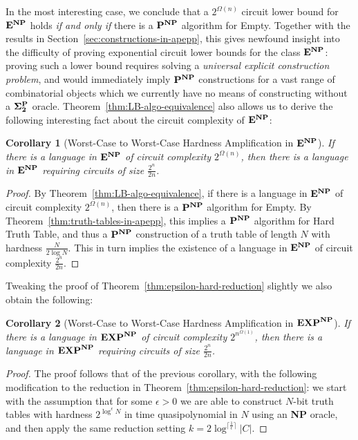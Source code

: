 \documentclass[11pt]{article}
\newtheorem{corollary}{Corollary}
\newcommand{\varbound}{\frac{2^n}{2n}}
\newcommand{\ttbound}{\frac{N}{2\log N}}
\def\cl{\bf}
\begin{document}
In the most interesting case, we conclude that a $2^{\Omega(n)}$ circuit lower bound for ${\cl E}^{\cl NP}$ holds \emph{if and only if} there is a ${\cl P}^{\cl NP}$ algorithm for {\sc Empty}. Together with the results in Section~\ref{sec:constructions-in-apepp}, this gives newfound insight into the difficulty of proving exponential circuit lower bounds for the class ${\cl E}^{\cl NP}$: proving such a lower bound requires solving a \emph{universal explicit construction problem}, and would immediately imply ${\cl P}^{\cl NP}$ constructions for a vast range of combinatorial objects which we currently have no means of constructing without a ${\cl \Sigma_2^P}$ oracle. Theorem~\ref{thm:LB-algo-equivalence} also allows us to derive the following interesting fact about the circuit complexity of ${\cl E}^{\cl NP}$:
\begin{corollary}[Worst-Case to Worst-Case Hardness Amplification in ${\cl E}^{\cl NP}$]\label{cor:e-hard}
If there is a language in ${\cl E}^{\cl NP}$ of circuit complexity $2^{\Omega(n)}$, then there is a language in ${\cl E}^{\cl NP}$ requiring circuits of size $\varbound$.
\end{corollary}
\begin{proof}
By Theorem~\ref{thm:LB-algo-equivalence}, if  there is a language in ${\cl E}^{\cl NP}$ of circuit complexity $2^{\Omega(n)}$, then there is a ${\cl P}^{\cl NP}$ algorithm for {\sc Empty}. By Theorem~\ref{thm:truth-tables-in-apepp}, this implies a ${\cl P}^{\cl NP}$ algorithm for {\sc Hard Truth Table}, and thus a ${\cl P}^{\cl NP}$ construction of a truth table of length $N$ with hardness $\ttbound$. This in turn implies the existence of a language in ${\cl E}^{\cl NP}$ of circuit complexity $\varbound$. 
\end{proof}

Tweaking the proof of Theorem~\ref{thm:epsilon-hard-reduction} slightly we also obtain the following:
\begin{corollary}[Worst-Case to Worst-Case Hardness Amplification in ${\cl EXP}^{\cl NP}$]\label{cor:exp-hard}
If there is a language in ${\cl EXP}^{\cl NP}$ of circuit complexity $2^{n^{\Omega(1)}}$, then there is a language in ${\cl EXP}^{\cl NP}$ requiring circuits of size $\varbound$.
\end{corollary}
\begin{proof}
The proof follows that of the previous corollary, with the following modification to the reduction in Theorem~\ref{thm:epsilon-hard-reduction}: we start with the assumption that for some $\epsilon>0$ we are able to construct $N$-bit truth tables with hardness $2^{\log^{\epsilon}N}$ in time quasipolynomial in $N$ using an {\cl NP} oracle, and then apply the same reduction setting $k = 2\log^{\lceil \frac{1}{\epsilon} \rceil} |C|$.
\end{proof}
\end{document}

